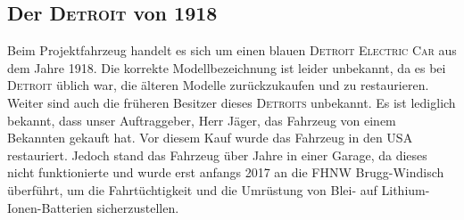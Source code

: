 \subsection{Der \textsc{Detroit} von 1918}
Beim Projektfahrzeug handelt es sich um einen blauen \textsc{Detroit Electric Car} aus dem Jahre 1918. Die korrekte Modellbezeichnung ist leider unbekannt, da es bei \textsc{Detroit} üblich war, die älteren Modelle zurückzukaufen und zu restaurieren. Weiter sind auch die früheren Besitzer dieses \textsc{Detroits} unbekannt. Es ist lediglich bekannt, dass unser Auftraggeber, Herr Jäger, das Fahrzeug von einem Bekannten gekauft hat. Vor diesem Kauf wurde das Fahrzeug in den USA restauriert. Jedoch stand das Fahrzeug über Jahre in einer Garage, da dieses nicht funktionierte und wurde erst anfangs 2017 an die FHNW Brugg-Windisch überführt, um die Fahrtüchtigkeit und die Umrüstung von Blei- auf Lithium-Ionen-Batterien sicherzustellen.